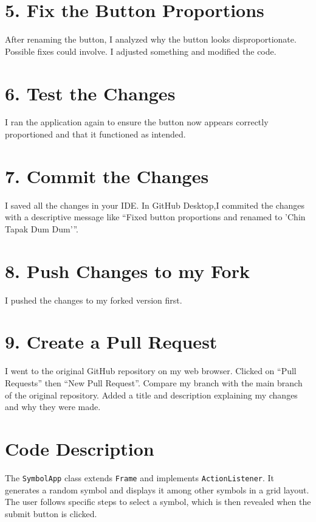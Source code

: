 \documentclass[12pt, a4paper]{article}
\begin{document}
\section*{ 5. Fix the Button Proportions}
After renaming the button, I analyzed why the button looks disproportionate. Possible fixes could involve. I adjusted something and modified the code.

\section*{ 6. Test the Changes}
I ran the application again to ensure the button now appears correctly proportioned and that it functioned as intended.

\section*{ 7. Commit the Changes}
I saved all the changes in your IDE.
In GitHub Desktop,I commited the changes with a descriptive message like “Fixed button proportions and renamed to 'Chin Tapak Dum Dum'”.

\section*{ 8. Push Changes to my Fork}
I pushed the changes to my forked version first.

\section*{9. Create a Pull Request}
I went to the original GitHub repository on my web browser.
Clicked on “Pull Requests” then “New Pull Request”.
Compare my branch with the main branch of the original repository.
Added a title and description explaining my changes and why they were made.


\section*{Code Description}
The \texttt{SymbolApp} class extends \texttt{Frame} and implements \texttt{ActionListener}. It generates a random symbol and displays it among other symbols in a grid layout. The user follows specific steps to select a symbol, which is then revealed when the submit button is clicked.
\end{document}
